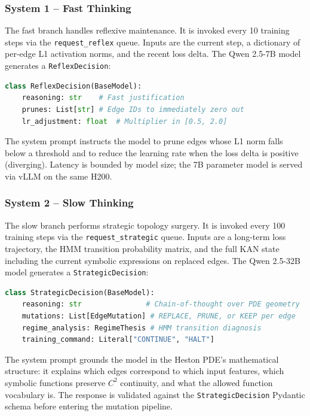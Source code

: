 \documentclass[11pt,a4paper]{article}
\begin{document}
\subsubsection{System 1 -- Fast Thinking}

The fast branch handles reflexive maintenance. It is invoked every 10 training steps via the \texttt{request\_reflex} queue. Inputs are the current step, a dictionary of per-edge L1 activation norms, and the recent loss delta. The Qwen 2.5-7B model generates a \texttt{ReflexDecision}:

\begin{lstlisting}[language=Python]
class ReflexDecision(BaseModel):
    reasoning: str    # Fast justification
    prunes: List[str] # Edge IDs to immediately zero out
    lr_adjustment: float  # Multiplier in [0.5, 2.0]
\end{lstlisting}

The system prompt instructs the model to prune edges whose L1 norm falls below a threshold and to reduce the learning rate when the loss delta is positive (diverging). Latency is bounded by model size; the 7B parameter model is served via vLLM on the same H200.

\subsubsection{System 2 -- Slow Thinking}

The slow branch performs strategic topology surgery. It is invoked every 100 training steps via the \texttt{request\_strategic} queue. Inputs are a long-term loss trajectory, the HMM transition probability matrix, and the full KAN state including the current symbolic expressions on replaced edges. The Qwen 2.5-32B model generates a \texttt{StrategicDecision}:

\begin{lstlisting}[language=Python]
class StrategicDecision(BaseModel):
    reasoning: str               # Chain-of-thought over PDE geometry
    mutations: List[EdgeMutation] # REPLACE, PRUNE, or KEEP per edge
    regime_analysis: RegimeThesis # HMM transition diagnosis
    training_command: Literal["CONTINUE", "HALT"]
\end{lstlisting}

The system prompt grounds the model in the Heston PDE's mathematical structure: it explains which edges correspond to which input features, which symbolic functions preserve $C^2$ continuity, and what the allowed function vocabulary is. The response is validated against the \texttt{StrategicDecision} Pydantic schema before entering the mutation pipeline.
\end{document}
